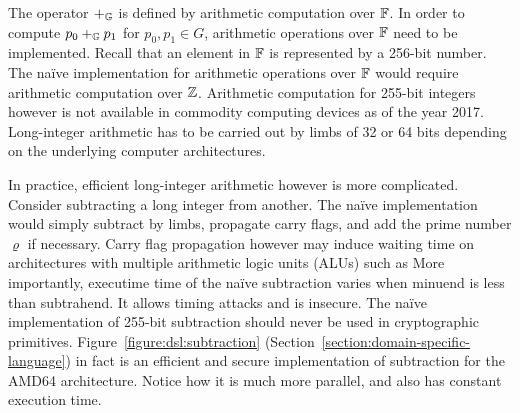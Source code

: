  
The operator $+_{\mathbb{G}}$ is defined by arithmetic computation over
$\mathbb{F}$. In order to compute $p_0 +_{\mathbb{G}} p_1$ for $p_0, p_1 \in G$,
arithmetic operations over $\mathbb{F}$ need to be implemented. Recall that
an element in $\mathbb{F}$ is represented by a 256-bit number. The na\"ive
implementation for arithmetic operations over $\mathbb{F}$ would require
arithmetic computation over $\mathbb{Z}$. Arithmetic computation for
255-bit integers however is not available in commodity computing
devices as of the year 2017. Long-integer arithmetic has to be carried
out by limbs of 32 or 64 bits depending on the underlying computer
architectures.

In practice, efficient long-integer arithmetic however is more
complicated. Consider subtracting a long integer from another. The
na\"ive implementation would simply subtract by limbs, propagate carry
flags, and add the prime number $\varrho$ if necessary. Carry flag
propagation however may induce waiting time on architectures with
multiple arithmetic logic units (ALUs) such as  
More importantly, executime time of the na\"ive subtraction varies
when minuend is less than subtrahend. It allows timing attacks and is
insecure. The na\"ive implementation of 255-bit subtraction should
never be used in cryptographic primitives. 
Figure~\ref{figure:dsl:subtraction}
(Section~\ref{section:domain-specific-language}) in fact is an
%
efficient and secure implementation of subtraction for the AMD64
architecture.  Notice how it is much more parallel, and also has
constant execution time.

